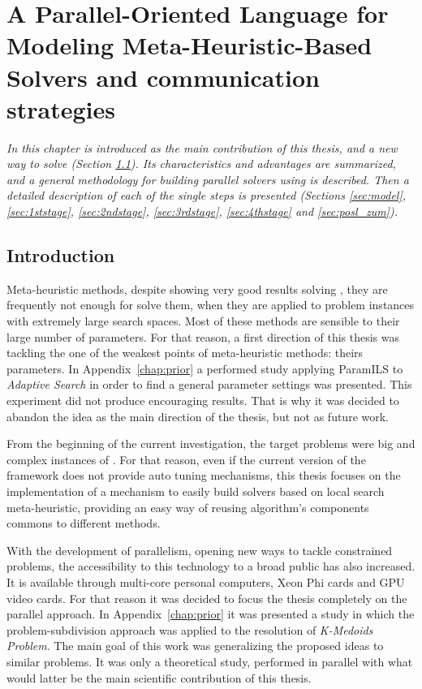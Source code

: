 \chapter{A Parallel-Oriented Language for Modeling Meta-Heuristic-Based Solvers and communication strategies}
\label{chap:posl}
\textit{In this chapter \posl{} is introduced as the main contribution of this thesis, and a new way to solve \csps{} (Section \ref{sec:posl_intro}). Its characteristics and advantages are summarized, and a general methodology for building parallel solvers using \posl{} is described. Then a detailed description of each of the single steps is presented (Sections \ref{sec:model}, \ref{sec:1ststage}, \ref{sec:2ndstage}, \ref{sec:3rdstage}, \ref{sec:4thstage} and \ref{sec:posl_zum}).}
\vfill
\minitoc
\newpage

\section{Introduction}
\label{sec:posl_intro}

Meta-heuristic methods, despite showing very good results solving \CSPs, they are frequently not enough for solve them, when they are applied to problem instances with extremely large search spaces. Most of these methods are sensible to their large number of parameters. For that reason, a first direction of this thesis was tackling the one of the weakest points of meta-heuristic methods: theirs parameters. In Appendix~\ref{chap:prior} a performed study applying {\sc ParamILS} to {\it Adaptive Search} in order to find a general parameter settings was presented. This experiment did not produce encouraging results. That is why it was decided to abandon the idea as the main direction of the thesis, but not as future work.

From the beginning of the current investigation, the target problems were big and complex instances of \csps. For that reason, even if the current version of the framework does not provide auto tuning mechanisms, this thesis focuses on the implementation of a mechanism to easily build solvers based on local search meta-heuristic, providing an easy way of reusing algorithm's components commons to different methods.

With the development of parallelism, opening new ways to tackle constrained problems, the accessibility to this technology to a broad public has also increased. It is available through multi-core personal computers, Xeon Phi cards and GPU video cards. For that reason it was decided to focus the thesis completely on the parallel approach. In Appendix~\ref{chap:prior} it was presented a study in which the problem-subdivision approach was applied to the resolution of {\it K-Medoids Problem}. The main goal of this work was generalizing the proposed ideas to similar problems. It was only a theoretical study, performed in parallel with what would latter be the main scientific contribution of this thesis.

